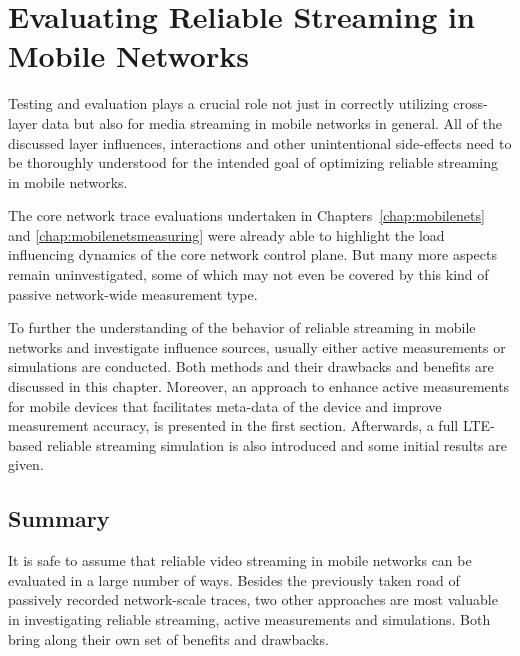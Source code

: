 \chapter{Evaluating Reliable Streaming in Mobile Networks}
\label{chap:mobilestreaming-measurements}

Testing and evaluation plays a crucial role not just in correctly utilizing cross-layer data but also for media streaming in mobile networks in general. All of the discussed layer influences, interactions and other unintentional side-effects need to be thoroughly understood for the intended goal of optimizing reliable streaming in mobile networks.

The core network trace evaluations undertaken in Chapters~\ref{chap:mobilenets} and \ref{chap:mobilenetsmeasuring} were already able to highlight the load influencing dynamics of the core network control plane. But many more aspects remain uninvestigated, some of which may not even be covered by this kind of passive network-wide measurement type.

To further the understanding of the behavior of reliable streaming in mobile networks and investigate influence sources, usually either active measurements or simulations are conducted. Both methods and their drawbacks and benefits are discussed in this chapter. Moreover, an approach to enhance active measurements for mobile devices that facilitates meta-data of the device and improve measurement accuracy, is presented in the first section. Afterwards, a full \gls{LTE}-based reliable streaming simulation is also introduced and some initial results are given.







\section{Summary}

It is safe to assume that reliable video streaming in mobile networks can be evaluated in a large number of ways. Besides the previously taken road of passively recorded network-scale traces, two other approaches are most valuable in investigating reliable streaming, active measurements and simulations. Both bring along their own set of benefits and drawbacks. 

